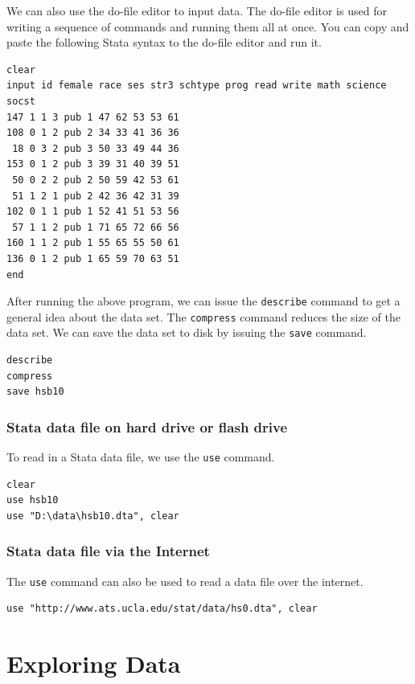 \documentclass{article}
\begin{document}
We can also use the do-file editor to input data. The do-file editor is used for writing a sequence of commands and running them all at once. You can copy and paste the following Stata syntax to the do-file editor and run it.

\begin{lstlisting}
clear
input id female race ses str3 schtype prog read write math science socst
147 1 1 3 pub 1 47 62 53 53 61
108 0 1 2 pub 2 34 33 41 36 36
 18 0 3 2 pub 3 50 33 49 44 36
153 0 1 2 pub 3 39 31 40 39 51
 50 0 2 2 pub 2 50 59 42 53 61
 51 1 2 1 pub 2 42 36 42 31 39
102 0 1 1 pub 1 52 41 51 53 56
 57 1 1 2 pub 1 71 65 72 66 56
160 1 1 2 pub 1 55 65 55 50 61
136 0 1 2 pub 1 65 59 70 63 51
end
\end{lstlisting}

After running the above program, we can issue the \lstinline{describe} command to get a general idea about the data set. The \lstinline{compress} command reduces the size of the data set. We can save the data set to disk by issuing the \lstinline{save} command.

\begin{lstlisting}
describe
compress
save hsb10
\end{lstlisting}

\subsubsection{Stata data file on hard drive or flash drive}
To read in a Stata data file, we use the \lstinline{use} command.

\begin{lstlisting}
clear
use hsb10
use "D:\data\hsb10.dta", clear
\end{lstlisting}

\subsubsection{Stata data file via the Internet}

The \lstinline{use} command can also be used to read a data file over the internet.

\begin{lstlisting}
use "http://www.ats.ucla.edu/stat/data/hs0.dta", clear
\end{lstlisting}

\section{Exploring Data}
\end{document}
